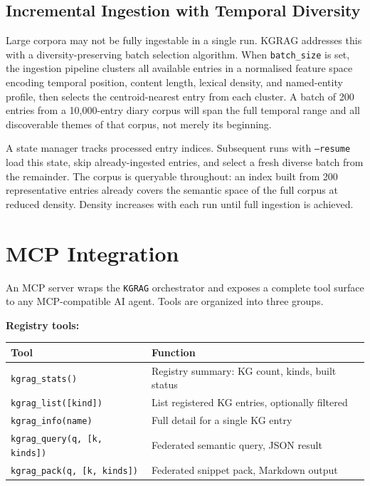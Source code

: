 \documentclass[10pt]{article}
\begin{document}
\subsection{Incremental Ingestion with Temporal Diversity}

Large corpora may not be fully ingestable in a single run. KGRAG addresses
this with a diversity-preserving batch selection algorithm. When
\texttt{batch\_size} is set, the ingestion pipeline clusters all available
entries in a normalised feature space encoding temporal position, content
length, lexical density, and named-entity profile, then selects the
centroid-nearest entry from each cluster. A batch of 200 entries from a
10,000-entry diary corpus will span the full temporal range and all discoverable
themes of that corpus, not merely its beginning.

A state manager tracks processed entry indices. Subsequent runs with
\texttt{--resume} load this state, skip already-ingested entries, and select a
fresh diverse batch from the remainder. The corpus is queryable throughout:
an index built from 200 representative entries already covers the semantic space
of the full corpus at reduced density. Density increases with each run until
full ingestion is achieved.

\section{MCP Integration}

An MCP server wraps the \texttt{KGRAG} orchestrator and exposes a complete
tool surface to any MCP-compatible AI agent. Tools are organized into three
groups.

\textbf{Registry tools:}
\begin{center}
\begin{tabular}{ll}
\toprule
Tool & Function \\
\midrule
\texttt{kgrag\_stats()} & Registry summary: KG count, kinds, built status \\
\texttt{kgrag\_list([kind])} & List registered KG entries, optionally filtered \\
\texttt{kgrag\_info(name)} & Full detail for a single KG entry \\
\texttt{kgrag\_query(q, [k, kinds])} & Federated semantic query, JSON result \\
\texttt{kgrag\_pack(q, [k, kinds])} & Federated snippet pack, Markdown output \\
\bottomrule
\end{tabular}
\end{center}
\end{document}
